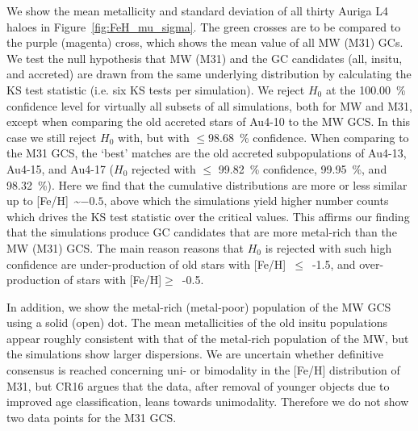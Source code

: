 \documentclass[a4paper,fleqn,usenatbib]{mnras}
\begin{document}
We show the mean metallicity and standard deviation of all thirty Auriga L4 haloes
in Figure~\ref{fig:FeH_mu_sigma}. The green crosses are to be compared to the 
purple (magenta) cross, which shows the mean value of all MW (M31) GCs. 
We test the null hypothesis that MW (M31) and the GC candidates (all, insitu, and
accreted) are drawn from the same underlying distribution by calculating the KS
test statistic (i.e. six KS tests per simulation). We reject $H_0$ at the 100.00~\%
confidence level for virtually all subsets of all simulations, both for MW and M31,
except when comparing the old accreted stars of \mbox{Au4-10} to the MW GCS. In this 
case we still reject $H_0$ with, but with $\leq 98.68$~\% confidence. When comparing
to the M31 GCS, the `best' matches are the old accreted subpopulations of \mbox{Au4-13},
\mbox{Au4-15}, and \mbox{Au4-17} ($H_0$ rejected with $\leq$ 99.82~\% confidence, 99.95~\%, 
and 98.32~\%). Here we find that the cumulative distributions are more or less 
similar up to [Fe/H]~\textasciitilde{}$-0.5$, above which the simulations yield higher number 
counts which drives the KS test statistic over the critical values. This affirms
our finding that the simulations produce GC candidates that are more metal-rich 
than the MW (M31) GCS. The main reason reasons that $H_0$ is rejected with such 
high confidence are under-production of old stars with [Fe/H]~$\leq$~-1.5,
and over-production of stars with [Fe/H]$\geq$~-0.5.

In addition, we show the metal-rich (metal-poor) population of the MW GCS using 
a solid (open) dot. The mean metallicities of the old insitu populations appear
roughly consistent with that of the metal-rich population of the MW, but the 
simulations show larger dispersions. We are uncertain whether definitive consensus 
is reached concerning uni- or bimodality in the [Fe/H] distribution of M31, but
CR16 argues that the data, after removal of younger objects due to improved age
classification, leans towards unimodality. Therefore we do not show two data
points for the M31 GCS.
\end{document}
